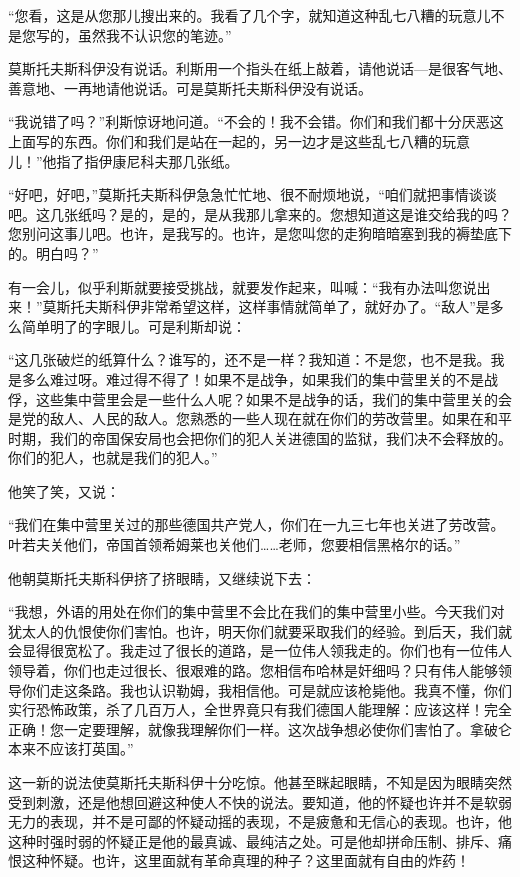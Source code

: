 “您看，这是从您那儿搜出来的。我看了几个字，就知道这种乱七八糟的玩意儿不是您写的，虽然我不认识您的笔迹。”

莫斯托夫斯科伊没有说话。利斯用一个指头在纸上敲着，请他说话—是很客气地、善意地、一再地请他说话。可是莫斯托夫斯科伊没有说话。

“我说错了吗？”利斯惊讶地问道。“不会的！我不会错。你们和我们都十分厌恶这上面写的东西。你们和我们是站在一起的，另一边才是这些乱七八糟的玩意儿！”他指了指伊康尼科夫那几张纸。

“好吧，好吧，”莫斯托夫斯科伊急急忙忙地、很不耐烦地说，“咱们就把事情谈谈吧。这几张纸吗？是的，是的，是从我那儿拿来的。您想知道这是谁交给我的吗？您别问这事儿吧。也许，是我写的。也许，是您叫您的走狗暗暗塞到我的褥垫底下的。明白吗？”

有一会儿，似乎利斯就要接受挑战，就要发作起来，叫喊：“我有办法叫您说出来！”莫斯托夫斯科伊非常希望这样，这样事情就简单了，就好办了。“敌人”是多么简单明了的字眼儿。可是利斯却说：

“这几张破烂的纸算什么？谁写的，还不是一样？我知道：不是您，也不是我。我是多么难过呀。难过得不得了！如果不是战争，如果我们的集中营里关的不是战俘，这些集中营里会是一些什么人呢？如果不是战争的话，我们的集中营里关的会是党的敌人、人民的敌人。您熟悉的一些人现在就在你们的劳改营里。如果在和平时期，我们的帝国保安局也会把你们的犯人关进德国的监狱，我们决不会释放的。你们的犯人，也就是我们的犯人。”

他笑了笑，又说：

“我们在集中营里关过的那些德国共产党人，你们在一九三七年也关进了劳改营。叶若夫关他们，帝国首领希姆莱也关他们……老师，您要相信黑格尔的话。”

他朝莫斯托夫斯科伊挤了挤眼睛，又继续说下去：

“我想，外语的用处在你们的集中营里不会比在我们的集中营里小些。今天我们对犹太人的仇恨使你们害怕。也许，明天你们就要采取我们的经验。到后天，我们就会显得很宽松了。我走过了很长的道路，是一位伟人领我走的。你们也有一位伟人领导着，你们也走过很长、很艰难的路。您相信布哈林是奸细吗？只有伟人能够领导你们走这条路。我也认识勒姆，我相信他。可是就应该枪毙他。我真不懂，你们实行恐怖政策，杀了几百万人，全世界竟只有我们德国人能理解：应该这样！完全正确！您一定要理解，就像我理解你们一样。这次战争想必使你们害怕了。拿破仑本来不应该打英国。”

这一新的说法使莫斯托夫斯科伊十分吃惊。他甚至眯起眼睛，不知是因为眼睛突然受到刺激，还是他想回避这种使人不快的说法。要知道，他的怀疑也许并不是软弱无力的表现，并不是可鄙的怀疑动摇的表现，不是疲惫和无信心的表现。也许，他这种时强时弱的怀疑正是他的最真诚、最纯洁之处。可是他却拼命压制、排斥、痛恨这种怀疑。也许，这里面就有革命真理的种子？这里面就有自由的炸药！

